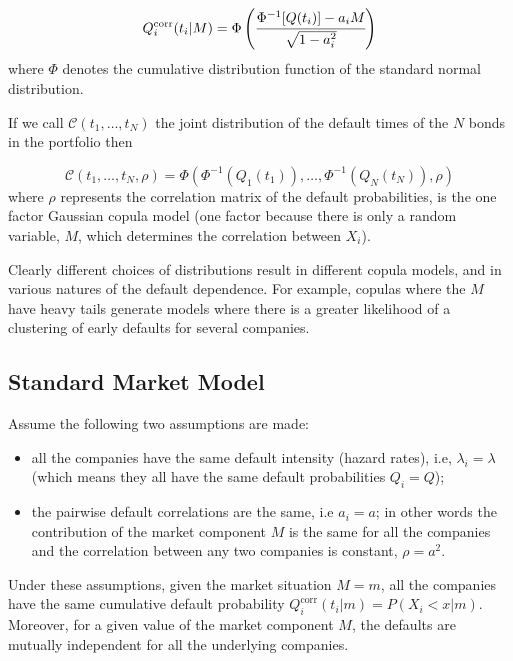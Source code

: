 \begin{equation}
Q_i^{\textrm{corr}}(t_i|M) = \Phi\left(\cfrac{\Phi^{-1}[Q(t_i)]-a_i M}{\sqrt{1-a_i^2}}\right)
\label{eq:gaussian_one_factor_copula}
\end{equation}
where $\Phi$ denotes the cumulative distribution function of the standard normal distribution.

If we call $\mathcal{C}(t_1,\ldots,t_N)$ the joint distribution of the default times of the $N$ bonds in the portfolio then

\begin{equation}
\mathcal{C}(t_1,\ldots,t_N, \rho)=\Phi(\Phi^{-1}(Q_1(t_1)),\ldots,\Phi^{-1}(Q_N(t_N)), \rho)
\end{equation}
where $\rho$ represents the correlation matrix of the default probabilities, is the one factor Gaussian copula model (one factor because there is only a random variable, $M$, which determines the correlation between $X_i$).

Clearly different choices of distributions result in different copula models, and in various natures of the default dependence. For example, copulas where the \(M\) have heavy tails generate models where there is a
greater likelihood of a clustering of early defaults for several
companies.

\subsection{Standard Market Model}\label{standard-market-model}

Assume the following two assumptions are made:

\begin{itemize}
	\tightlist
	\item
	all the companies have the same default intensity (hazard rates), i.e, \(\lambda_i = \lambda\) (which means they all have the same default probabilities $Q_i = Q$);
	\item
	the pairwise default correlations are the same, i.e \(a_i = a\); in other words the contribution of the market
	component $M$ is the same for all the companies and the correlation between any two companies is constant, \(\rho = a^2\).
\end{itemize}

Under these assumptions, given the market situation \(M = m\), all the
companies have the same cumulative default probability
\(Q_i^{\textrm{corr}}(t_i|m)=P(X_i < x|m)\). 
Moreover, for a given value of the
market component \(M\), the defaults are mutually independent for all
the underlying companies. 

